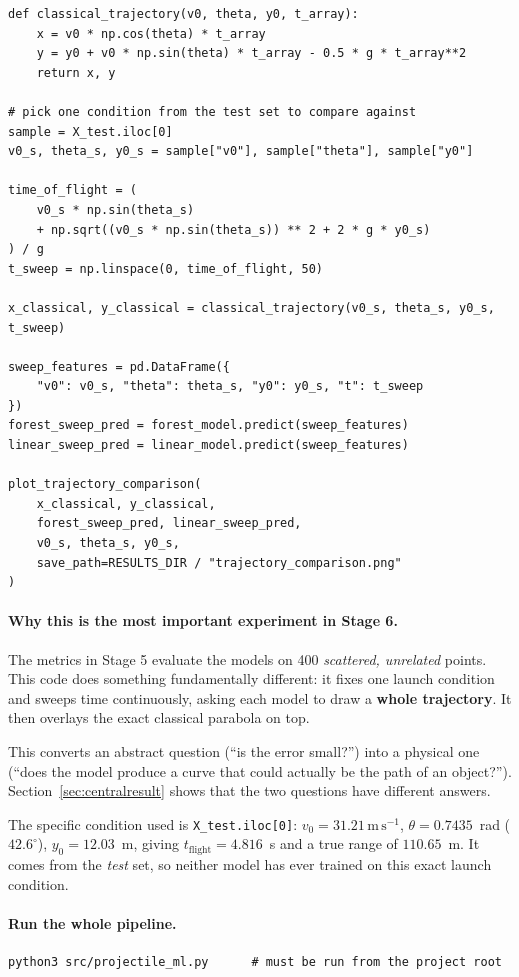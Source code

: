 \documentclass[11pt,a4paper]{article}
\newcommand{\vzero}{v_{0}}
\newcommand{\yzero}{y_{0}}
\newcommand{\ms}{\,\mathrm{m\,s^{-1}}}
\begin{document}
\begin{lstlisting}[caption={Stage 6c --- sweeping one launch condition over time.}]
def classical_trajectory(v0, theta, y0, t_array):
    x = v0 * np.cos(theta) * t_array
    y = y0 + v0 * np.sin(theta) * t_array - 0.5 * g * t_array**2
    return x, y

# pick one condition from the test set to compare against
sample = X_test.iloc[0]
v0_s, theta_s, y0_s = sample["v0"], sample["theta"], sample["y0"]

time_of_flight = (
    v0_s * np.sin(theta_s)
    + np.sqrt((v0_s * np.sin(theta_s)) ** 2 + 2 * g * y0_s)
) / g
t_sweep = np.linspace(0, time_of_flight, 50)

x_classical, y_classical = classical_trajectory(v0_s, theta_s, y0_s, t_sweep)

sweep_features = pd.DataFrame({
    "v0": v0_s, "theta": theta_s, "y0": y0_s, "t": t_sweep
})
forest_sweep_pred = forest_model.predict(sweep_features)
linear_sweep_pred = linear_model.predict(sweep_features)

plot_trajectory_comparison(
    x_classical, y_classical,
    forest_sweep_pred, linear_sweep_pred,
    v0_s, theta_s, y0_s,
    save_path=RESULTS_DIR / "trajectory_comparison.png"
)
\end{lstlisting}

\paragraph{Why this is the most important experiment in Stage 6.}
The metrics in Stage 5 evaluate the models on 400 \emph{scattered, unrelated} points. This code does
something fundamentally different: it fixes one launch condition and sweeps time continuously,
asking each model to draw a \textbf{whole trajectory}. It then overlays the exact classical parabola
on top.

This converts an abstract question (``is the error small?'') into a physical one (``does the model
produce a curve that could actually be the path of an object?''). Section~\ref{sec:centralresult}
shows that the two questions have different answers.

The specific condition used is \texttt{X\_test.iloc[0]}: $\vzero=31.21\ms$,
$\theta=0.7435$~rad ($42.6^\circ$), $\yzero=12.03$~m, giving $t_{\text{flight}}=4.816$~s and a true
range of $110.65$~m. It comes from the \emph{test} set, so neither model has ever trained on this
exact launch condition.

\paragraph{Run the whole pipeline.}
\begin{lstlisting}[style=shellstyle,numbers=none]
python3 src/projectile_ml.py      # must be run from the project root
\end{lstlisting}
\end{document}
